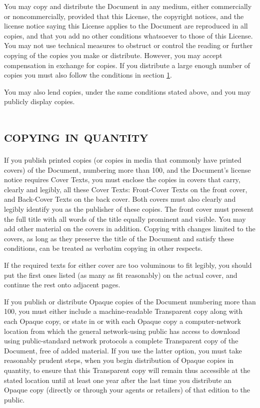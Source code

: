 You may copy and distribute the Document in any medium, either commercially
or noncommercially, provided that this License, the copyright notices, and
the license notice saying this License applies to the Document are
reproduced in all copies, and that you add no other conditions whatsoever
to those of this License. You may not use technical measures to obstruct or
control the reading or further copying of the copies you make or
distribute. However, you may accept compensation in exchange for copies.
If you distribute a large enough number of copies you must also follow the
conditions in section \ref{sec:copying}.

You may also lend copies, under the same conditions stated above, and you
may publicly display copies.


\section[Copying in quantity]{\scshape copying in
quantity}\label{sec:copying}

If you publish printed copies (or copies in media that commonly have
printed covers) of the Document, numbering more than 100, and the
Document's license notice requires Cover Texts, you must enclose the copies
in covers that carry, clearly and legibly, all these Cover Texts:
Front-Cover Texts on the front cover, and Back-Cover Texts on the back
cover. Both covers must also clearly and legibly identify you as the
publisher of these copies. The front cover must present the full title with
all words of the title equally prominent and visible. You may add other
material on the covers in addition. Copying with changes limited to the
covers, as long as they preserve the title of the Document and satisfy
these conditions, can be treated as verbatim copying in other respects.

If the required texts for either cover are too voluminous to fit legibly,
you should put the first ones listed (as many as fit reasonably) on the
actual cover, and continue the rest onto adjacent pages.

If you publish or distribute Opaque copies of the Document numbering more
than 100, you must either include a machine-readable Transparent copy along
with each Opaque copy, or state in or with each Opaque copy a
computer-network location from which the general network-using public has
access to download using public-standard network protocols a complete
Transparent copy of the Document, free of added material. If you use the
latter option, you must take reasonably prudent steps, when you begin
distribution of Opaque copies in quantity, to ensure that this Transparent
copy will remain thus accessible at the stated location until at least one
year after the last time you distribute an Opaque copy (directly or through
your agents or retailers) of that edition to the public.

